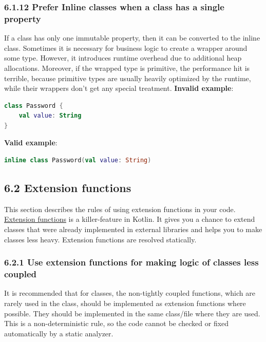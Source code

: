 \subsubsection*{\textbf{6.1.12 Prefer Inline classes when a class has a single property}}
\leavevmode\newline
\label{sec:6.1.12}
If a class has only one immutable property, then it can be converted to the inline class.
Sometimes it is necessary for business logic to create a wrapper around some type. However, it introduces runtime overhead due to additional heap allocations. Moreover, if the wrapped type is primitive, the performance hit is terrible, because primitive types are usually heavily optimized by the runtime, while their wrappers don't get any special treatment.
\textbf{Invalid example}:
\begin{lstlisting}[language=Kotlin]
class Password {
    val value: String
}
\end{lstlisting}
\textbf{Valid example}:
\begin{lstlisting}[language=Kotlin]
inline class Password(val value: String)
\end{lstlisting}
\subsection*{\textbf{6.2 Extension functions}}
\label{sec:6.2}
This section describes the rules of using extension functions in your code.
\href{https://kotlinlang.org/docs/reference/extensions.html}{Extension functions} is a killer-feature in Kotlin.
It gives you a chance to extend classes that were already implemented in external libraries and helps you to make classes less heavy.
Extension functions are resolved statically.
\subsubsection*{\textbf{6.2.1 Use extension functions for making logic of classes less coupled}}
\leavevmode\newline
\label{sec:6.2.1}
It is recommended that for classes, the non-tightly coupled functions, which are rarely used in the class, should be implemented as extension functions where possible.
They should be implemented in the same class/file where they are used. This is a non-deterministic rule, so the code cannot be checked or fixed automatically by a static analyzer.
